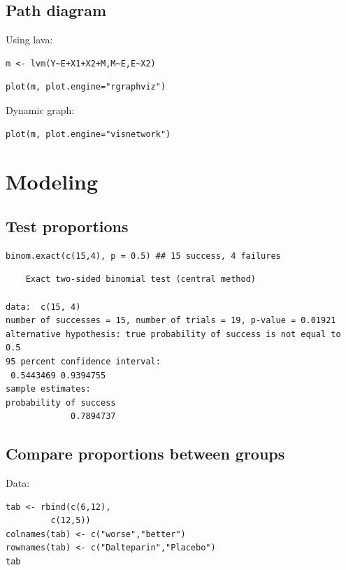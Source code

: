 \documentclass{article}
\begin{document}
\subsection{Path diagram}
\label{sec:org62bc231}
Using lava:
\lstset{language=r,label= ,caption= ,captionpos=b,numbers=none}
\begin{lstlisting}
m <- lvm(Y~E+X1+X2+M,M~E,E~X2)
\end{lstlisting}

\lstset{language=r,label= ,caption= ,captionpos=b,numbers=none}
\begin{lstlisting}
plot(m, plot.engine="rgraphviz")
\end{lstlisting}

Dynamic graph:
\lstset{language=r,label= ,caption= ,captionpos=b,numbers=none}
\begin{lstlisting}
plot(m, plot.engine="visnetwork")
\end{lstlisting}

\section{Modeling}
\label{sec:org8fff321}
\subsection{Test proportions}
\label{sec:org051d28b}
\lstset{language=r,label= ,caption= ,captionpos=b,numbers=none}
\begin{lstlisting}
binom.exact(c(15,4), p = 0.5) ## 15 success, 4 failures
\end{lstlisting}

\begin{verbatim}
	Exact two-sided binomial test (central method)

data:  c(15, 4)
number of successes = 15, number of trials = 19, p-value = 0.01921
alternative hypothesis: true probability of success is not equal to 0.5
95 percent confidence interval:
 0.5443469 0.9394755
sample estimates:
probability of success 
             0.7894737
\end{verbatim}

\subsection{Compare proportions between groups}
\label{sec:orgf194834}

Data:
\lstset{language=r,label= ,caption= ,captionpos=b,numbers=none}
\begin{lstlisting}
tab <- rbind(c(6,12),
	     c(12,5))
colnames(tab) <- c("worse","better")
rownames(tab) <- c("Dalteparin","Placebo")
tab
\end{lstlisting}
\end{document}
